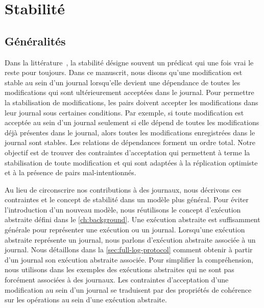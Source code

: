 \section{Stabilité}\label{sec:stability}

\subsection{Généralités}\label{subsec:general-stability}

Dans la littérature~\autocite{baquero_2018_pure-op-crdt, shapiro_2011_crdt,birman_1991_causalmulticast}, la stabilité désigne souvent un prédicat qui une fois vrai le reste pour toujours.
Dans ce manuscrit, nous disons qu'une modification est stable au sein d'un journal lorsqu'elle devient une dépendance de toutes les modifications qui sont ultérieurement acceptées dans le journal.
Pour permettre la stabilisation de modifications, les pairs doivent accepter les modifications dans leur journal sous certaines conditions.
Par exemple, si toute modification est acceptée au sein d'un journal seulement si elle dépend de toutes les modifications déjà présentes dans le journal, alors toutes les modifications enregistrées dans le journal sont stables.
Les relations de dépendances forment un ordre total.
Notre objectif est de trouver des contraintes d'acceptation qui permettent à terme la stabilisation de toute modification et qui sont adaptées à la réplication optimiste et à la présence de pairs mal-intentionnés.

Au lieu de circonscrire nos contributions à des journaux, nous décrivons ces contraintes et le concept de stabilité dans un modèle plus général.
Pour éviter l'introduction d'un nouveau modèle, nous réutilisons le concept d'exécution abstraite défini dans le \autoref{ch:background}.
Une exécution abstraite est suffisamment générale pour représenter une exécution ou un journal.
Lorsqu'une exécution abstraite représente un journal, nous parlons d'exécution abstraite associée à un journal.
Nous détaillons dans la \autoref{sec:full-log-protocol} comment obtenir à partir d'un journal son exécution abstraite associée.
Pour simplifier la compréhension, nous utilisons dans les exemples des exécutions abstraites qui ne sont pas forcément associées à des journaux.
Les contraintes d'acceptation d'une modification au sein d'un journal se traduisent par des propriétés de cohérence sur les opérations au sein d'une exécution abstraite.


